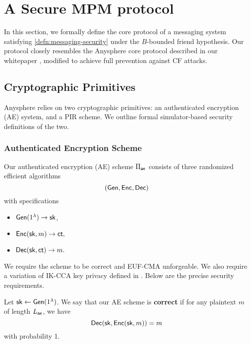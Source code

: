 \section{A Secure MPM protocol}
\label{sec:asphr-defn}
In this section, we formally define the core protocol of a messaging system satisfying \cref{defn:messaging-security} under the $B$-bounded friend hypothesis. Our protocol closely resembles the Anysphere core protocol described in our whitepaper \cite{whitepaper}, modified to achieve full prevention against CF attacks.
\subsection{Cryptographic Primitives}
Anysphere relies on two cryptographic primitives: an authenticated encryption (AE) system, and a PIR scheme. We outline formal simulator-based security definitions of the two.

\subsubsection{Authenticated Encryption Scheme}
\label{subsec:AE}
Our authenticated encryption (AE) scheme $\Pi_{\mathsf{ae}}$ consists of three randomized efficient algorithms 
$$(\mathsf{Gen}, \mathsf{Enc}, \mathsf{Dec})$$
with specifications
\begin{itemize}
    \item $\mathsf{Gen}(1^{\lambda}) \to {\ensuremath{\mathsf{sk}}}$,
    \item $\mathsf{Enc}({\mathsf{sk}}, m) \to \mathsf{ct},$
    \item $\mathsf{Dec}({\mathsf{sk}}, \mathsf{ct}) \to m.$
\end{itemize}
We require the scheme to be correct and EUF-CMA unforgeable. We also require a variation of IK-CCA key privacy defined in \cite{BBDP01keyprivate}. Below are the precise security requirements.

\begin{definition}
\label{defn:AE-correctness}
Let ${\mathsf{sk}} \leftarrow \mathsf{Gen}(1^{\lambda})$. We say that our AE scheme is \textbf{correct} if for any plaintext $m$ of length $L_{\mathsf{ae}}$, we have
$$\mathsf{Dec}({\mathsf{sk}}, \mathsf{Enc}({\mathsf{sk}}, m)) = m$$
with probability 1.
\end{definition}

